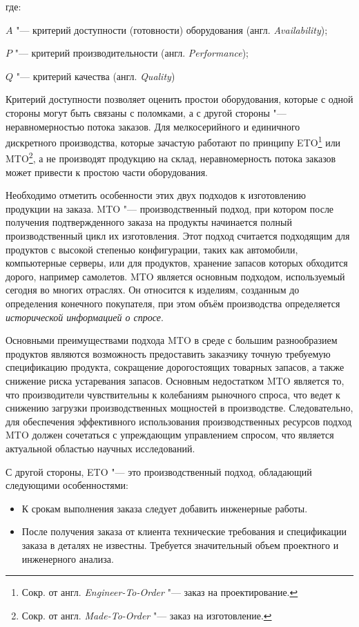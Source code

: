 \noindent где:

\noindent $A$ "--- критерий доступности (готовности) оборудования (англ. \textit{Availability});

\noindent $P$ "--- критерий производительности (англ. \textit{Performance});

\noindent $Q$ "--- критерий качества (англ. \textit{Quality})

Критерий доступности позволяет оценить простои оборудования, которые с одной стороны могут быть связаны с поломками, а с другой стороны "--- неравномерностью потока заказов. Для мелкосерийного и единичного дискретного производства, которые зачастую работают по принципу ETO\footnote{Сокр. от англ. \textit{Engineer-To-Order} "--- заказ на проектирование.} или MTO\footnote{Сокр. от англ. \textit{Made-To-Order} "--- заказ на изготовление.}, а не производят продукцию на склад, неравномерность потока заказов может привести к простою части оборудования.

Необходимо отметить особенности этих двух подходов к изготовлению продукции на заказа. MTO "--- производственный подход, при котором после получения подтвержденного заказа на продукты начинается полный производственный цикл их изготовления. Этот подход считается подходящим для продуктов с высокой степенью конфигурации, таких как автомобили, компьютерные серверы, или для продуктов, хранение запасов которых обходится дорого, например самолетов. MTO является основным подходом, используемый сегодня во многих отраслях. Он относится к изделиям, созданным до определения конечного покупателя, при этом объём производства определяется \textit{исторической информацией о спросе}.

Основными преимуществами подхода MTO в среде с большим разнообразием продуктов являются возможность предоставить заказчику точную требуемую спецификацию продукта, сокращение дорогостоящих товарных запасов, а также снижение риска устаревания запасов.
Основным недостатком MTO является то, что производители чувствительны к колебаниям рыночного спроса, что ведет к снижению загрузки производственных мощностей в производстве. Следовательно, для обеспечения эффективного использования производственных ресурсов подход MTO должен сочетаться с упреждающим управлением спросом, что является актуальной областью научных исследований.

С другой стороны, ETO "--- это производственный подход, обладающий следующими особенностями:

\begin{itemize}
	\item К срокам выполнения заказа следует добавить инженерные работы.
	\item После получения заказа от клиента технические требования и спецификации заказа в деталях не известны. Требуется значительный объем проектного и инженерного анализа.
\end{itemize}

